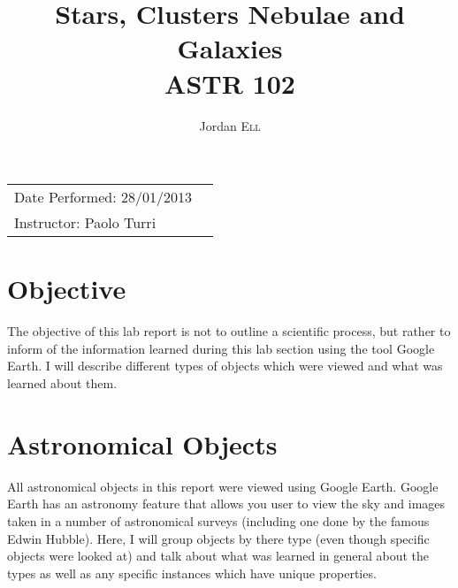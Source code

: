 \documentclass{article}
\title{Stars, Clusters Nebulae and Galaxies \\ ASTR 102} %
\author{Jordan \textsc{Ell}} %
\begin{document}
\maketitle %

\begin{tabular}{lr}
Date Performed: 28/01/2013\\ %
Instructor: Paolo Turri %
\end{tabular}

\setlength\parindent{0pt} %

\renewcommand{\labelenumi}{\alph{enumi}.} %


\section{Objective}
The objective of this lab report is not to outline a scientific process, but rather to inform
of the information learned during this lab section using the tool Google Earth. I will describe
different types of objects which were viewed and what was learned about them.

 

\section{Astronomical Objects}
All astronomical objects in this report were viewed using Google Earth. Google Earth has an
astronomy feature that allows you user to view the sky and images taken in a number of
astronomical surveys (including one done by the famous Edwin Hubble). Here, I will group 
objects by there type (even though specific objects were looked at) and talk about what was
learned in general about the types as well as any specific instances which have unique 
properties.
\end{document}

